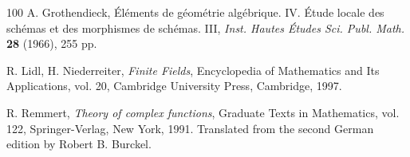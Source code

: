 \documentclass{amsart}
\theoremstyle{definition}
\begin{document}
\begin{thebibliography}{100}
		 A. Grothendieck, Éléments de géométrie algébrique. IV. Étude locale des schémas et des morphismes de schémas. III, \textit{Inst. Hautes Études Sci. Publ. Math.} \textbf{28} (1966), 255 pp.
		
		
		
		
		
		
		
		 R. Lidl, H. Niederreiter, \textit{Finite Fields}, Encyclopedia of Mathematics and Its Applications, vol. 20, Cambridge University Press, Cambridge, 1997.
		
		
		
		
		
		
		
		
		 R. Remmert, \textit{Theory of complex functions}, Graduate Texts in Mathematics, vol. 122, Springer-Verlag, New York, 1991. Translated from the second German edition by Robert B. Burckel.
		
		
		
		
		
		
		
		
		
	\end{thebibliography}
\end{document}
